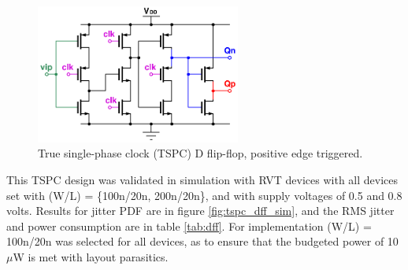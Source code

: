 			\begin{figure}[htb!]
			        \centering
			        \includegraphics[width=0.6\textwidth, angle=0]{./figs/design/tspc_}
			    \caption{True single-phase clock (TSPC) D flip-flop, positive edge triggered.}
			    \label{fig:tspc_dff}
			\end{figure}

		This TSPC design was validated in simulation with RVT devices with all devices set with (W/L) = \{100n/20n, 200n/20n\}, and with supply voltages of 0.5 and 0.8 volts. Results for jitter PDF are in figure \ref{fig:tspc_dff_sim}, and the RMS jitter and power consumption are in table \ref{tab:dff}. For implementation (W/L) = 100n/20n was selected for all devices, as to ensure that the budgeted power of 10 $\mu$W is met with layout parasitics. 




